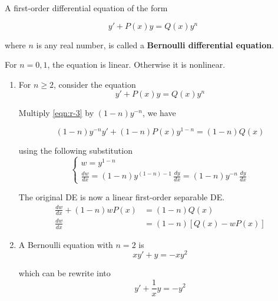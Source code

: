 \begin{example}
    A first-order differential equation of the form 

    \[
        y' + P(x)y = Q(x)y^n
    \]

    where $n$ is any real number, is called a \textbf{Bernoulli differential equation}.

    For $n = 0, 1$, the equation is linear. Otherwise it is nonlinear.

\end{example}
\begin{solution}
    \begin{enumerate}
        \item For $n \geq 2$, consider the equation 
            \begin{equation}
                y' + P(x)y = Q(x)y^n \label{eqn:r-3}
            \end{equation}

            Multiply \eqref{eqn:r-3} by $(1-n)y^{-n}$, we have 

            \[
                (1-n)y^{-n}y' + (1-n)P(x)y^{1-n} = (1-n)Q(x)
            \]

            using the following substitution
            \[
                \begin{cases}
                    w = y^{1-n}\\[0.5em]
                    \displaystyle \frac{dw}{dx} = (1-n)y^{(1-n)-1}\, \frac{dy}{dx} = (1-n)y^{-n}\, \frac{dy}{dx}
                \end{cases}
            \]

            The original DE is now a linear first-order separable DE.
            \begin{align*}
                \frac{dw}{dx} + (1-n)w P(x) &= (1-n)Q(x)\\
                \frac{dw}{dx} &= (1-n)[Q(x) - wP(x)] 
            \end{align*}

        \item A Bernoulli equation with $n=2$ is 
            \begin{equation}
                xy' + y = -xy^2
            \end{equation}

            which can be rewrite into 
            \begin{equation}
                y' + \frac{1}{x} y = - y^2 
            \end{equation}
    \end{enumerate}
\end{solution}

